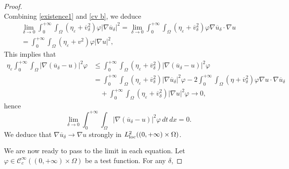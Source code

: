 \documentclass[reqno,12pt,twoside]{amsart}
\numberwithin{equation}{section} \numberwithin{theorem}{section}
\numberwithin{proposition}{section} \numberwithin{lemma}{section}
\numberwithin{corollary}{section}
\numberwithin{definition}{section} \numberwithin{remark}{section}
\begin{document}
\begin{proof}
\begin{equation}
\end{equation}
Combining \eqref{existence1} and \eqref{cv b}, we deduce
\begin{multline*}\lim_{\delta \to 0} \int_0^{+\infty}\int_\Omega (\eta_\varepsilon+\overline{v}_\delta^2)\varphi |\nabla \overline{u}_\delta|^2 =\lim_{\delta \to 0} \int_0^{+\infty}\int_\Omega (\eta_\varepsilon+\overline{v}_\delta^2)\varphi \nabla \overline{u}_\delta\cdot \nabla u\\
=\int_0^{+\infty}\int_\Omega (\eta_\varepsilon+v^2)\varphi |\nabla u|^2,
\end{multline*}
%
%
This implies that
\begin{align*}
\eta_\varepsilon \int_0^{+\infty} \int_\Omega  |\nabla (\overline{u}_\delta-u)|^2 \varphi &\leqslant \int_0^{+\infty} \int_\Omega  (\eta_\varepsilon+\overline{v}_\delta^2) |\nabla (\overline{u}_\delta-u)|^2 \varphi \\
& = \int_0^{+\infty} \int_\Omega (\eta_\varepsilon+\overline{v}_\delta^2)|\nabla \overline{u}_\delta|^2 \varphi- 2\int_0^{+\infty} \int_\Omega (\eta+\overline{v}_\delta^2)\varphi \nabla u\cdot \nabla \overline{u}_\delta\\
&\quad +\int_0^{+\infty} \int_\Omega (\eta_\varepsilon+\overline{v}_\delta^2)|\nabla u|^2 \varphi\longrightarrow 0,
\end{align*}
 hence
\begin{equation}\label{cv forte L1}
\lim_{\delta \to 0} \int_0^{+\infty} \int_\Omega |\nabla (\overline{u}_\delta-u)|^2\varphi \, dt\, dx=0.
\end{equation}
We deduce that $\nabla \overline{u}_\delta \to \nabla u$ strongly in $L^2_{\rm loc}((0,+\infty) \times \Omega)$.
 
 \medskip
 
We are now ready to pass to the limit in each equation. Let $\varphi \in \mathcal{C}_c^\infty ((0,+\infty) \times \Omega)$ be a test function. For any $\delta$, 


\end{proof}
\end{document}
